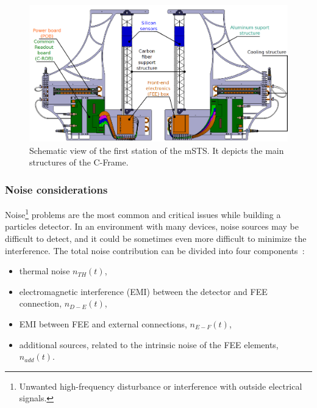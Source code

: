\begin{figure}[!h]
\centering
\includegraphics[width=0.9\columnwidth]{Chapter6/DCS/images/unit0.png}
\caption{Schematic view of the first station of the \gls{mSTS}. It depicts the main structures of the C-Frame. }
\label{fig_msts_scheme}
\end{figure}
\newpage


\subsubsection{Noise considerations}
Noise\footnote{Unwanted high-frequency disturbance or interference with outside electrical signals.} problems are the most common and critical issues while building a particles detector. In an environment with many devices, noise sources may be difficult to detect, and it could be sometimes even more difficult to minimize the interference. The total noise contribution can be divided into four components~\cite{noise_twepp2008}:
\begin{itemize}
    \item thermal noise $n_{TH}(t)$,
    \item electromagnetic interference (\gls{EMI}) between the detector and \gls{FEE} connection, $n_{D-E}(t)$,
    \item \gls{EMI} between \gls{FEE} and external connections, $n_{E-F}(t)$,
    \item additional sources, related to the intrinsic noise of the FEE elements, $n_{add}(t)$.
\end{itemize}


